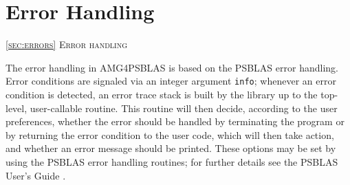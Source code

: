 \section{Error Handling\label{sec:errors}}
         {\textsc{\ref{sec:errors} Error handling}}

The error handling in AMG4PSBLAS is based on the PSBLAS error
handling. Error conditions are signaled via an integer argument
\verb|info|; whenever an error condition is detected, an error trace
stack is built by the library up to the top-level, user-callable
routine. This routine will then decide, according to the user
preferences, whether the error should be handled by terminating the
program or by returning the error condition to the user code, which
will then take action, and whether
an error message should be printed. These options may be set by using
the PSBLAS error handling routines; for further details see the PSBLAS
User's Guide \cite{PSBLASGUIDE}.

